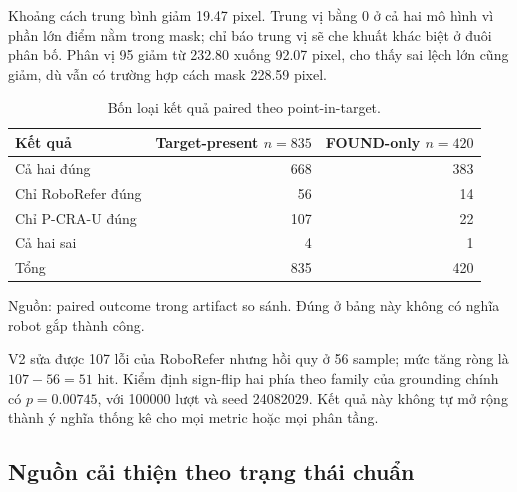 Khoảng cách trung bình giảm 19.47 pixel. Trung vị bằng 0
ở cả hai mô hình vì phần lớn điểm nằm trong mask; chỉ báo
trung vị sẽ che khuất khác biệt ở đuôi phân bố. Phân vị
95 giảm từ 232.80 xuống 92.07 pixel, cho thấy sai lệch
lớn cũng giảm, dù vẫn có trường hợp cách mask 228.59 pixel.

\begin{table}[htbp]
    \centering
    \setlength{\tabcolsep}{4pt}
    \renewcommand{\arraystretch}{1.15}
    \caption{Bốn loại kết quả paired theo point-in-target.}
    \label{tab:results-paired-outcomes}
    \small
    \begin{tabularx}{\textwidth}{@{}>{\raggedright\arraybackslash}Xrr@{}}
        \toprule
        Kết quả & \shortstack{Target-present\\$n=835$} & \shortstack{FOUND-only\\$n=420$} \\
        \midrule
        Cả hai đúng & 668 & 383 \\
        Chỉ RoboRefer đúng & 56 & 14 \\
        Chỉ P-CRA-U đúng & 107 & 22 \\
        Cả hai sai & 4 & 1 \\
        \midrule
        Tổng & 835 & 420 \\
        \bottomrule
    \end{tabularx}
    \vspace{2pt}
    {\footnotesize\raggedright Nguồn: paired outcome trong artifact so sánh.
    Đúng ở bảng này không có nghĩa robot gắp thành công.\par}
\end{table}

V2 sửa được 107 lỗi của RoboRefer nhưng hồi quy ở 56
sample; mức tăng ròng là $107-56=51$ hit. Kiểm định
sign-flip hai phía theo family của grounding chính có
$p=0.00745$, với 100000 lượt và seed 24082029.
Kết quả này không tự mở rộng thành ý nghĩa thống kê
cho mọi metric hoặc mọi phân tầng.

\subsection{Nguồn cải thiện theo trạng thái chuẩn}

